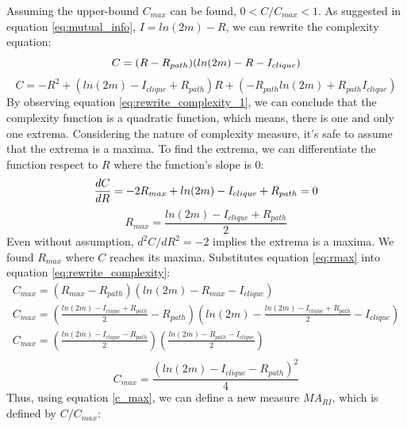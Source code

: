 \documentclass[12pt]{article}
\begin{document}
Assuming the upper-bound $C_{max}$ can be found, $0<C/C_{max}<1$. As suggested in equation \ref{eq:mutual_info}, $I = ln(2m)-R$, we can rewrite the complexity equation:\\
\begin{equation}
    \label{eq:rewrite_complexity}
     C = (R-R_{path})(ln(2m)-R-I_{clique})\\
\end{equation}
\begin{equation}
    \label{eq:rewrite_complexity_1}
    C = -R^2+(ln(2m)-I_{clique}+R_{path})R+(-R_{path}ln(2m)+R_{path}I_{clique})
\end{equation}
By observing equation \ref{eq:rewrite_complexity_1}, we can conclude that the complexity function is a quadratic function, which means, there is one and only one extrema. Considering the nature of complexity measure, it's safe to assume that the extrema is a maxima. To find the extrema, we can differentiate the function respect to $R$ where the function's slope is 0:
\begin{equation}
    \label{eq:mari_diff}
        \frac{dC}{dR} = -2R_{max}+ln(2m)-I_{clique}+R_{path} = 0\\
\end{equation}
\begin{equation}
    \label{eq:rmax}
    R_{max} = \frac{ln(2m)-I_{clique}+R_{path}}{2}
\end{equation}
\noindent
Even without assumption, $d^2C/dR^2 = -2$ implies the extrema is a maxima. We found $R_{max}$ where $C$ reaches its maxima. 
Substitutes equation \ref{eq:rmax} into equation \ref{eq:rewrite_complexity}:\\
\begin{equation}
    \begin{gathered}
        C_{max} =(R_{max}-R_{path})(ln(2m)-R_{max}-I_{clique})\\
        C_{max} = (\frac{ln(2m)-I_{clique}+R_{path}}{2}-R_{path})(ln(2m)-\frac{ln(2m)-I_{clique}+R_{path}}{2}-I_{clique})\\
        C_{max} = (\frac{ln(2m)-I_{clique}-R_{path}}{2})(\frac{ln(2m)-R_{path}-I_{clique}}{2})\\
    \end{gathered}
\end{equation}
\begin{equation}
    \label{c_max}
    C_{max} = \frac{(ln(2m)-I_{clique}-R_{path})^2}{4}
\end{equation}
\noindent
Thus, using equation \ref{c_max}, we can define a new measure $MA_{RI}$, which is defined by $C/C_{max}$:\\
\end{document}
